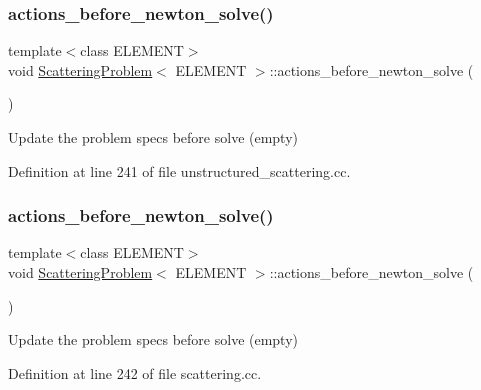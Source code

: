 \subsubsection{\texorpdfstring{actions\+\_\+before\+\_\+newton\+\_\+solve()}{actions\_before\_newton\_solve()}\hspace{0.1cm}{\footnotesize\ttfamily [1/2]}}
{\footnotesize\ttfamily template$<$class E\+L\+E\+M\+E\+NT$>$ \\
void \hyperlink{classScatteringProblem}{Scattering\+Problem}$<$ E\+L\+E\+M\+E\+NT $>$\+::actions\+\_\+before\+\_\+newton\+\_\+solve (\begin{DoxyParamCaption}{ }\end{DoxyParamCaption})\hspace{0.3cm}{\ttfamily [inline]}}



Update the problem specs before solve (empty) 



Definition at line 241 of file unstructured\+\_\+scattering.\+cc.

\mbox{\label{classScatteringProblem_a91ce14b928ec6edbb9d85515a310b1fb}} 
\subsubsection{\texorpdfstring{actions\+\_\+before\+\_\+newton\+\_\+solve()}{actions\_before\_newton\_solve()}\hspace{0.1cm}{\footnotesize\ttfamily [2/2]}}
{\footnotesize\ttfamily template$<$class E\+L\+E\+M\+E\+NT$>$ \\
void \hyperlink{classScatteringProblem}{Scattering\+Problem}$<$ E\+L\+E\+M\+E\+NT $>$\+::actions\+\_\+before\+\_\+newton\+\_\+solve (\begin{DoxyParamCaption}{ }\end{DoxyParamCaption})\hspace{0.3cm}{\ttfamily [inline]}}



Update the problem specs before solve (empty) 



Definition at line 242 of file scattering.\+cc.

